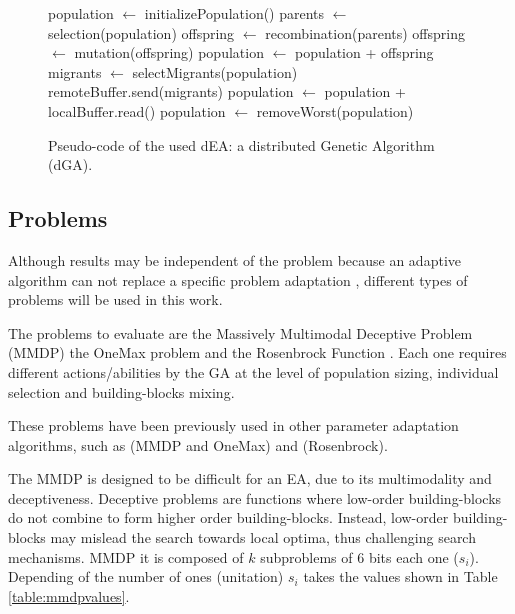 \documentclass[final,1p,times]{elsarticle}
\begin{document}
\begin{figure}[htb]

\begin{algorithmic}
\STATE population $\gets$ initializePopulation()
    \STATE parents $\gets$ selection(population)
    \STATE offspring $\gets$ recombination(parents)
    \STATE offspring $\gets$ mutation(offspring)
    \STATE population $\gets$ population + offspring
      \STATE migrants $\gets$ selectMigrants(population)
      \STATE remoteBuffer.send(migrants)
    \ENDIF
      \STATE population $\gets$ population + localBuffer.read()
    \ENDIF
    \STATE population $\gets$ removeWorst(population)
\ENDWHILE

\end{algorithmic}
\caption{Pseudo-code of the used dEA: a distributed Genetic Algorithm (dGA).}
\label{fig:EA}
\end{figure}




\subsection{Problems}

Although results may be independent of the problem because an adaptive algorithm can not replace a specific problem adaptation \cite{PanaceasClune05}, different types of problems will be used in this work.

The problems to evaluate are the Massively Multimodal Deceptive
Problem (MMDP) \cite{goldberg92massive}  the OneMax problem
\cite{ONEMAX} and the Rosenbrock Function \cite{}. Each one requires different actions/abilities by the GA
at the level of population sizing, individual selection and
building-blocks mixing. 

These problems have been previously used in other parameter adaptation algorithms, such as \cite{ParallelGATongchim02} (MMDP and OneMax) and \cite{DifferentialWeber09,AdaptationSizesSchlierkamp96} (Rosenbrock). 


The MMDP
 is designed to be difficult for an EA, due to
its multimodality and deceptiveness. Deceptive problems are functions where low-order building-blocks do not combine to form higher order building-blocks. Instead, low-order building-blocks may mislead the search towards local optima, thus challenging search mechanisms. MMDP it is composed of $k$ subproblems of 6 bits each one ($s_i$). Depending of
the number of ones (unitation) $s_i$ takes the values shown in Table \ref{table:mmdpvalues}.  
\end{document}
